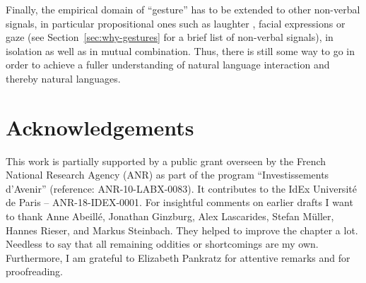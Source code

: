 \documentclass[output=paper]{langsci/langscibook}
\begin{document}
Finally, the empirical domain of \enquote{gesture} has to be extended to other non-verbal signals, in particular propositional ones such as laughter \citep{Ginzburg:Breitholz:Cooper:Hough:Tian:2015}, facial expressions or gaze (see Section~\ref{sec:why-gestures} for a brief list of non-verbal signals), in isolation as well as in mutual combination.
%
Thus, there is still some way to go in order to achieve a fuller understanding of natural language interaction and thereby natural languages.


 
\section*{Acknowledgements}


This work is partially supported by a public grant overseen by the French National Research Agency (ANR) as part of the program ``Investissements d'Avenir'' (reference: ANR-10-LABX-0083). It contributes to the IdEx Université de Paris -- ANR-18-IDEX-0001. For insightful comments on earlier drafts I want to thank Anne Abeillé, Jonathan Ginzburg, Alex Lascarides, Stefan Müller, Hannes Rieser, and Markus Steinbach. They helped to improve the chapter a lot. Needless to say that all remaining oddities or shortcomings are my own. Furthermore, I am grateful to Elizabeth Pankratz for attentive remarks and for proofreading. 



{\sloppy
\printbibliography[heading=subbibliography,notkeyword=this]
}
\end{document}
